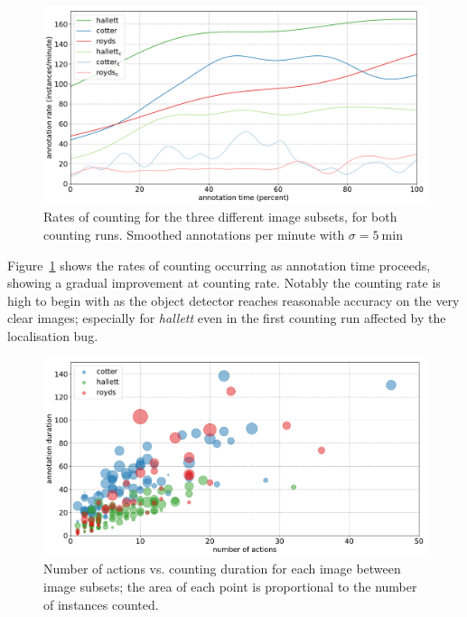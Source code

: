 \begin{figure}[ht]
\centering
\includegraphics[width=1.0\linewidth]{charts/aerial_penguins/summaries/instance_rates.pdf}
\caption{ Rates of counting for the three different image subsets, for both counting runs. Smoothed annotations per minute with $\sigma=\SI{5}{\minute}$ }
\label{fig:penguin_rates}
\end{figure}

Figure~\ref{fig:penguin_rates} shows the rates of counting occurring as annotation time proceeds, showing a gradual improvement at counting rate. Notably the counting rate is high to begin with as the object detector reaches reasonable accuracy on the very clear images; especially for \emph{hallett} even in the first counting run affected by the localisation bug. 


\begin{figure}[ht]
\centering
\includegraphics[width=1.0\linewidth]{charts/aerial_penguins/actions_time_a.pdf}
\caption{ Number of actions vs. counting duration for each image between image subsets; the area of each point is proportional to the number of instances counted. }
\label{fig:actions_time_penguins}
\end{figure}

